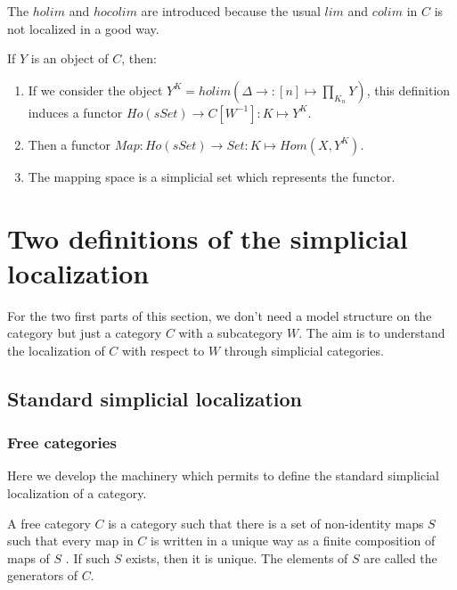 \begin{refsection}
\begin{rmk}
The $holim$ and $hocolim$ are introduced because the usual $lim$ and $colim$ in $C$ is not localized in a good way. 
\end{rmk}

\begin{defin}
If $Y$ is an object of $C$, then:
\begin{enumerate}
\item If we consider the object $Y^K=holim(\Delta \rightarrow : [n] \mapsto \prod_{K_n} Y)$, this definition induces a functor $Ho(sSet) \rightarrow C[W^{-1}] : K \mapsto Y^K$.
\item Then a functor $Map : Ho(sSet) \rightarrow Set : K \mapsto Hom(X,Y^K)$.
\item The mapping space is a simplicial set which represents the functor.

\end{enumerate}
\end{defin}


\section{Two definitions of the simplicial localization}

For the two first parts of this section, we don't need a model structure on the category but just a category $C$ with a subcategory $W$. The aim is to understand the localization of $C$ with respect to $W$ through simplicial categories.

\subsection{Standard simplicial localization}

\subsubsection{Free categories}

Here we develop the machinery which permits to define the standard simplicial localization of a category.

\begin{defin}
A free category $C$ is a category such that there is a set of non-identity maps $S$ such that every map in $C$ is written in a unique way as a finite composition of maps of $S$ . If such $S$ exists, then it is unique. The elements of $S$ are called the generators of $C$.
\end{defin}



\end{refsection}
